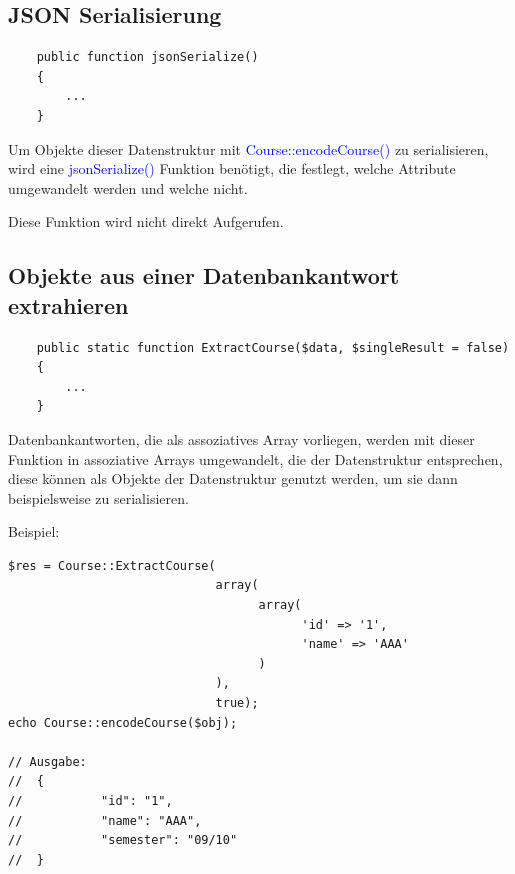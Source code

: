\documentclass[10pt,a4paper,final,parskip]{scrartcl}
\newcommand{\blau}[1]{\textcolor{blue}{#1}}
\begin{document}
\subsection{JSON Serialisierung}
\begin{minipage}{\textwidth}
\begin{lstlisting}
    public function jsonSerialize() 
    {
    	...
    }
\end{lstlisting}
\end{minipage}

Um Objekte dieser Datenstruktur mit \blau{Course::encodeCourse()} zu serialisieren, wird eine \blau{jsonSerialize()} Funktion benötigt, die festlegt, welche Attribute umgewandelt werden und welche nicht. 

Diese Funktion wird nicht direkt Aufgerufen.

\subsection{Objekte aus einer Datenbankantwort extrahieren}
\begin{minipage}{\textwidth}
\begin{lstlisting}
    public static function ExtractCourse($data, $singleResult = false)
    {
    	...
    }
\end{lstlisting}
\end{minipage}

Datenbankantworten, die als assoziatives Array vorliegen, werden mit dieser Funktion in assoziative Arrays umgewandelt, die der Datenstruktur entsprechen, diese können als Objekte der Datenstruktur genutzt werden, um sie dann beispielsweise zu serialisieren.

\begin{minipage}{\textwidth}
Beispiel:
\begin{lstlisting}
$res = Course::ExtractCourse(
                             array(
                                   array(
                                         'id' => '1',
                                         'name' => 'AAA'
                                   )
                             ),
                             true);
echo Course::encodeCourse($obj);

// Ausgabe: 
//	{
//           "id": "1",
//           "name": "AAA",
//           "semester": "09/10"
//	}
\end{lstlisting}
\end{minipage}
\end{document}
